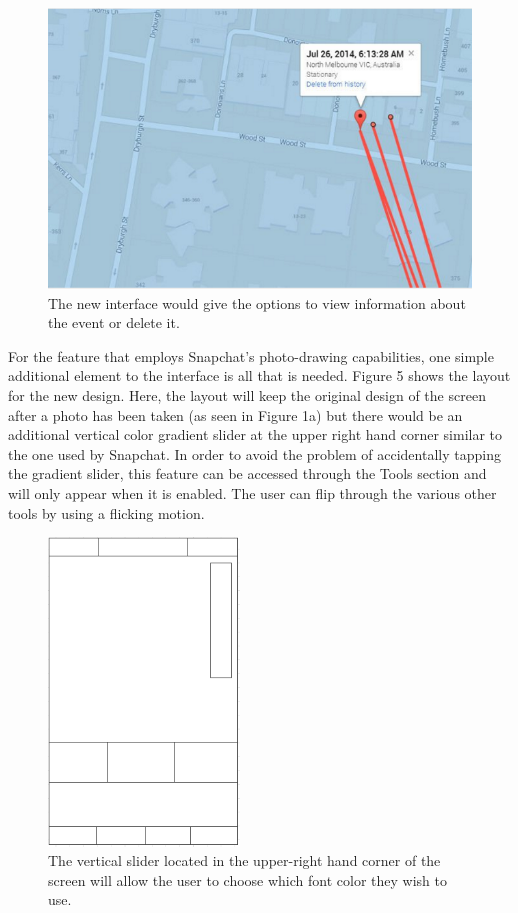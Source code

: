 \documentclass[11pt]{article}
\begin{document}
\pagebreak

\begin{figure}[ht]
\centering
\includegraphics[width=5in]{images/google_maps_tracking_with_info.png}
\caption{The new interface would give the options to view information about the event or delete it.}
\label{google_tracking}
\end{figure}

   \indent For the feature that employs Snapchat's photo-drawing capabilities, one simple additional element to the interface is all that is needed. Figure 5 shows the layout for the new design. Here, the layout will keep the original design of the screen after a photo has been taken (as seen in Figure 1a) but there would be an additional vertical color gradient slider at the upper right hand corner similar to the one used by Snapchat. In order to avoid the problem of accidentally tapping the gradient slider, this feature can be accessed through the Tools section and will only appear when it is enabled. The user can flip through the various other tools by using a flicking motion. 
      
\begin{figure}[ht]
\centering
\includegraphics[width=2in]{images/wireframe.png}
\caption{The vertical slider located in the upper-right hand corner of the screen will allow the user to choose which font color they wish to use.}
\label{wireframe}
\end{figure}
\end{document}
